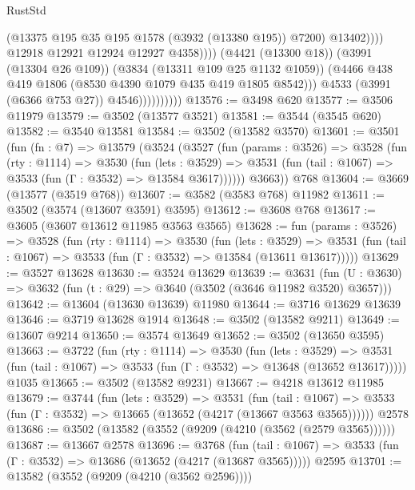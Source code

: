 \begin{lexlean}{RustStd}
\begin{coremodule}
                                          (@13375 @195 @35 @195 @1578 (@3932 (@13380 @195)) @7200)
                                          @13402))))
                                  @12918
                                  @12921
                                  @12924
                                  @12927
                                  @4358))))
                          (@4421 (@13300 @18))
                          (@3991 (@13304 @26 @109))
                          (@3834 (@13311 @109 @25 @1132 @1059))
                          (@4466 @438 @419 @1806 (@8530 @4390 @1079 @435 @419 @1805 @8542)))
                        @4533
                        (@3991 (@6366 @753 @27))
                        @4546))))))))))
@13576 := @3498 @620
@13577 := @3506 @11979
@13579 := @3502 (@13577 @3521)
@13581 := @3544 (@3545 @620)
@13582 := @3540 @13581
@13584 := @3502 (@13582 @3570)
@13601 := @3501
    (fun (fn : @7) =>
    @13579
      (@3524
        (@3527
          (fun (params : @3526) =>
          @3528
            (fun (rty : @1114) =>
            @3530
              (fun (lets : @3529) =>
              @3531 (fun (tail : @1067) => @3533 (fun (Γ : @3532) => @13584 @3617))))))
        @3663))
    @768
@13604 := @3669 (@13577 (@3519 @768))
@13607 := @3582 (@3583 @768) @11982
@13611 := @3502 (@3574 (@13607 @3591) @3595)
@13612 := @3608 @768
@13617 := @3605 (@3607 @13612 @11985 @3563 @3565)
@13628 := fun (params : @3526) =>
  @3528
    (fun (rty : @1114) =>
    @3530
      (fun (lets : @3529) =>
      @3531 (fun (tail : @1067) => @3533 (fun (Γ : @3532) => @13584 (@13611 @13617)))))
@13629 := @3527 @13628
@13630 := @3524 @13629
@13639 := @3631
    (fun (U : @3630) => @3632 (fun (t : @29) => @3640 (@3502 (@3646 @11982 @3520) @3657)))
@13642 := @13604 (@13630 @13639) @11980
@13644 := @3716 @13629 @13639
@13646 := @3719 @13628 @1914
@13648 := @3502 (@13582 @9211)
@13649 := @13607 @9214
@13650 := @3574 @13649
@13652 := @3502 (@13650 @3595)
@13663 := @3722
    (fun (rty : @1114) =>
    @3530
      (fun (lets : @3529) =>
      @3531 (fun (tail : @1067) => @3533 (fun (Γ : @3532) => @13648 (@13652 @13617)))))
    @1035
@13665 := @3502 (@13582 @9231)
@13667 := @4218 @13612 @11985
@13679 := @3744
    (fun (lets : @3529) =>
    @3531
      (fun (tail : @1067) =>
      @3533 (fun (Γ : @3532) => @13665 (@13652 (@4217 (@13667 @3563 @3565))))))
    @2578
@13686 := @3502 (@13582 (@3552 (@9209 (@4210 (@3562 (@2579 @3565))))))
@13687 := @13667 @2578
@13696 := @3768
    (fun (tail : @1067) => @3533 (fun (Γ : @3532) => @13686 (@13652 (@4217 (@13687 @3565)))))
    @2595
@13701 := @13582 (@3552 (@9209 (@4210 (@3562 @2596))))

\end{coremodule}
\end{lexlean}
